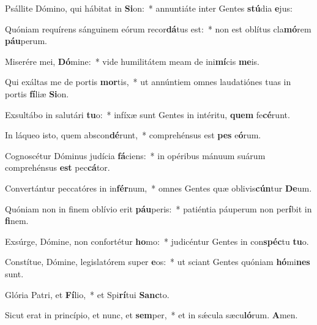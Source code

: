 \item Psállite Dómino, qui hábitat in \textbf{Si}on:~* annuntiáte inter Gentes \textbf{stú}dia \textbf{e}jus:
\item Quóniam requírens sánguinem eórum recor\textbf{dá}tus est:~* non est oblítus cla\textbf{mó}rem \textbf{páu}perum.
\item Miserére mei, \textbf{Dó}mine:~* vide humilitátem meam de ini\textbf{mí}cis \textbf{me}is.
\item Qui exáltas me de portis \textbf{mor}tis,~* ut annúntiem omnes laudatiónes tuas in portis \textbf{fí}liæ \textbf{Si}on.
\item Exsultábo in salutári \textbf{tu}o:~* infíxæ sunt Gentes in intéritu, \textbf{quem} fe\textbf{cé}runt.
\item In láqueo isto, quem abscon\textbf{dé}runt,~* comprehénsus est \textbf{pes} e\textbf{ó}rum.
\item Cognoscétur Dóminus judícia \textbf{fá}ciens:~* in opéribus mánuum suárum comprehénsus \textbf{est} pec\textbf{cá}tor.
\item Convertántur peccatóres in in\textbf{fér}num,~* omnes Gentes quæ oblivis\textbf{cún}tur \textbf{De}um.
\item Quóniam non in finem oblívio erit \textbf{páu}peris:~* patiéntia páuperum non per\textbf{í}bit in \textbf{fi}nem.
\item Exsúrge, Dómine, non confortétur \textbf{ho}mo:~* judicéntur Gentes in con\textbf{spéc}tu \textbf{tu}o.
\item Constítue, Dómine, legislatórem super \textbf{e}os:~* ut sciant Gentes quóniam \textbf{hó}mi\textbf{nes} sunt.
\item Glória Patri, et \textbf{Fí}lio,~* et Spi\textbf{rí}tui \textbf{Sanc}to.
\item Sicut erat in princípio, et nunc, et \textbf{sem}per,~* et in sǽcula sæcu\textbf{ló}rum. \textbf{A}men.
